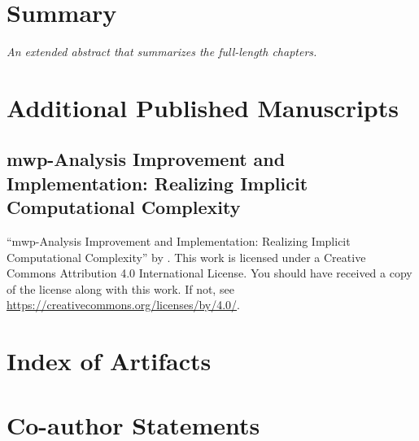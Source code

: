 \chapter{Summary}\label{ch:summary}
\begin{center}
    \emph{An extended abstract that summarizes the full-length chapters.}
\end{center}
\clearpage
{\newsectoff\newsect}

\printbibliography[label=chap:references, title=References, heading=bibnumbered]

\appendix
\continousappendix

\chapter{Additional Published Manuscripts}\label{app:additional-manuscripts}

    \section{mwp-Analysis Improvement and Implementation: Realizing Implicit
    Computational Complexity}\label{sec:fscd}
    \pageIconAnalysis
    {\par\enquote{mwp-Analysis Improvement and Implementation: Realizing
    Implicit Computational Complexity}
    \textcopyright{ }by{ }\CTNT.
    \newline{}This work is licensed under a Creative Commons Attribution 4.0
    International License.
    \newline{}You should have received a copy of the license along with this work.
    \newline{}If not, see \url{https://creativecommons.org/licenses/by/4.0/}.}
    
    \clearpage

\chapter{Index of Artifacts}\label{app:sec:artifacts}

\clearpage

\chapter{Co-author Statements}\label{app:sec:coauth}

\clearpage

\pagestyle{plain}
\printglossary[title={Index of Acronyms},type=\acronymtype,nonumberlist,
    style=longragged]
\clearpage

\pagestyle{plain}
\printglossary[type=symbols]
\clearpage

\printindex